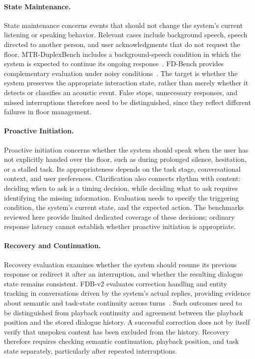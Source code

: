 \paragraph{State Maintenance.}
State maintenance concerns events that should not change the system's current listening or speaking behavior. Relevant cases include background speech, speech directed to another person, and user acknowledgments that do not request the floor. MTR-DuplexBench includes a background-speech condition in which the system is expected to continue its ongoing response~\citep{DBLP:conf/acl/HeCXLZBMK26}. FD-Bench provides complementary evaluation under noisy conditions~\citep{DBLP:conf/interspeech/PengCNMN0C25}. The target is whether the system preserves the appropriate interaction state, rather than merely whether it detects or classifies an acoustic event. False stops, unnecessary responses, and missed interruptions therefore need to be distinguished, since they reflect different failures in floor management.

\paragraph{Proactive Initiation.}
Proactive initiation concerns whether the system should speak when the user has not explicitly handed over the floor, such as during prolonged silence, hesitation, or a stalled task. Its appropriateness depends on the task stage, conversational context, and user preferences. Clarification also connects rhythm with content: deciding when to ask is a timing decision, while deciding what to ask requires identifying the missing information. Evaluation needs to specify the triggering condition, the system's current state, and the expected action. The benchmarks reviewed here provide limited dedicated coverage of these decisions; ordinary response latency cannot establish whether proactive initiation is appropriate.

\paragraph{Recovery and Continuation.}
Recovery evaluation examines whether the system should resume its previous response or redirect it after an interruption, and whether the resulting dialogue state remains consistent. FDB-v2 evaluates correction handling and entity tracking in conversations driven by the system's actual replies, providing evidence about semantic and task-state continuity across turns~\citep{DBLP:conf/acl/LinKSCAWL26}. Such outcomes need to be distinguished from playback continuity and agreement between the playback position and the stored dialogue history. A successful correction does not by itself verify that unspoken content has been excluded from the history. Recovery therefore requires checking semantic continuation, playback position, and task state separately, particularly after repeated interruptions.

